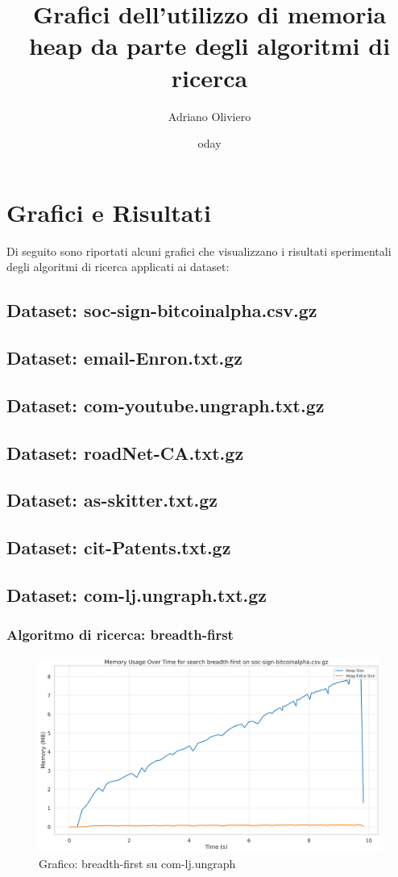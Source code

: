 \documentclass{article}
\title{Grafici dell'utilizzo di memoria heap da parte degli algoritmi di ricerca}
\author{Adriano Oliviero}
\date{	oday}
\begin{document}
\maketitle
\tableofcontents
\newpage
\section{Grafici e Risultati}
Di seguito sono riportati alcuni grafici che visualizzano i risultati sperimentali degli algoritmi di ricerca applicati ai dataset:
\subsection{Dataset: soc-sign-bitcoinalpha.csv.gz}
\subsection{Dataset: email-Enron.txt.gz}
\subsection{Dataset: com-youtube.ungraph.txt.gz}
\subsection{Dataset: roadNet-CA.txt.gz}
\subsection{Dataset: as-skitter.txt.gz}
\subsection{Dataset: cit-Patents.txt.gz}
\subsection{Dataset: com-lj.ungraph.txt.gz}
\subsubsection{Algoritmo di ricerca: breadth-first}
\begin{figure}[h]\centering
\includegraphics[width=\textwidth]{../plots/soc-sign-bitcoinalpha.csv_breadth-first.png}
\caption{Grafico: breadth-first su com-lj.ungraph}
\end{figure}
\end{document}
